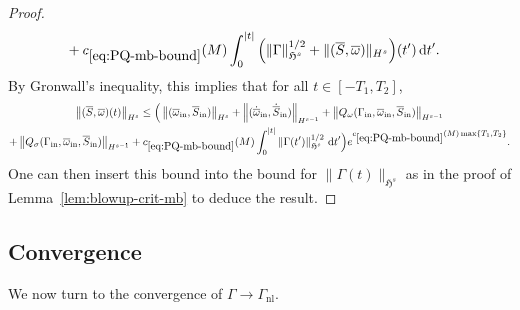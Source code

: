 \documentclass[10pt]{amsart}
\theoremstyle{definition}\newtheorem{defi}[theo]{Definition}\newtheorem{rema}[theo]{Remark}\newtheorem{exam}[theo]{Example}\newtheorem{exem}[theo]{Example}\newtheorem{nota}[theo]{Notation}
\newcommand{\rmin}{\mathrm{in}}
\newcommand{\nl}{\mathrm{nl}}
\renewcommand\bar{\overline}
\newcommand{\gH}{\mathfrak{H}}
\renewcommand\d[1]{{\ensuremath{\,\text{d}#1}}}
\begin{document}
\begin{proof}
\begin{multline}
\begin{aligned}
&+c_{\eqref{eq:PQ-mb-bound}}(M)\int_0^{|t|}\Big(
\|\Gamma\|_{\gH^s }^{1/2} +\|(\overline{S},\overline{\omega})\|_{H^s }\Big)(t')\d t'.
\end{aligned}
\end{multline}
By Gronwall's inequality, this implies that for all $t\in[-T_1,T_2]$,
\begin{multline*}
\left\|(\bar{S},\bar{\omega})(t)\right\|_{H^s}\leq \Big(\left\|(\overline{\omega}_\rmin, \overline{S}_\rmin)\right\|_{H^s} + \left\|(\dot{\overline{\omega}}_\rmin, \dot{\overline{S}}_\rmin)\right\|_{H^{s-1}} +\left\|Q_\omega(\Gamma_\rmin, \overline{\omega}_\rmin, \overline{S}_\rmin)\right\|_{H^{s-1}} \\
+\left\|Q_\sigma(\Gamma_\rmin, \overline{\omega}_\rmin, \overline{S}_\rmin)\right\|_{H^{s-1}}+c_{\eqref{eq:PQ-mb-bound}}(M)\int_0^{|t|}
\|\Gamma(t')\|_{\gH^s }^{1/2}\,\d t'\Big)e^{c_{\eqref{eq:PQ-mb-bound}}(M)\max\{T_1,T_2\}}.
\end{multline*}
One can then insert this bound into the bound for $\|\Gamma(t)\|_{\gH^s}$ as in the proof of Lemma~\ref{lem:blowup-crit-mb} to deduce the result.
\end{proof}



\subsection{Convergence}

We now turn to the convergence of $\Gamma \to \Gamma_\nl$.
\end{document}
